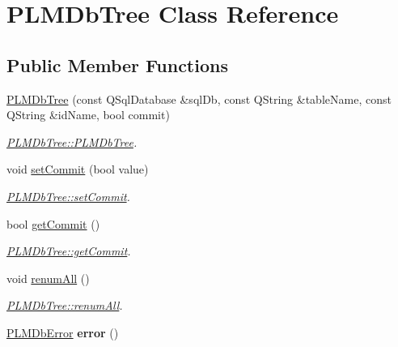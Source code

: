 \hypertarget{class_p_l_m_db_tree}{}\section{P\+L\+M\+Db\+Tree Class Reference}
\label{class_p_l_m_db_tree}
\subsection*{Public Member Functions}
\begin{DoxyCompactItemize}
\item 
\hyperlink{class_p_l_m_db_tree_a23d35341defc8ccd6cd75989eecca77b}{P\+L\+M\+Db\+Tree} (const Q\+Sql\+Database \&sql\+Db, const Q\+String \&table\+Name, const Q\+String \&id\+Name, bool commit)
\begin{DoxyCompactList}\small\item\em \hyperlink{class_p_l_m_db_tree_a23d35341defc8ccd6cd75989eecca77b}{P\+L\+M\+Db\+Tree\+::\+P\+L\+M\+Db\+Tree}. \end{DoxyCompactList}\item 
void \hyperlink{class_p_l_m_db_tree_aeab32bcea9b1ff524eeefa34248a5d86}{set\+Commit} (bool value)
\begin{DoxyCompactList}\small\item\em \hyperlink{class_p_l_m_db_tree_aeab32bcea9b1ff524eeefa34248a5d86}{P\+L\+M\+Db\+Tree\+::set\+Commit}. \end{DoxyCompactList}\item 
bool \hyperlink{class_p_l_m_db_tree_a68299ded7c927c8c2557915811ac9d10}{get\+Commit} ()
\begin{DoxyCompactList}\small\item\em \hyperlink{class_p_l_m_db_tree_a68299ded7c927c8c2557915811ac9d10}{P\+L\+M\+Db\+Tree\+::get\+Commit}. \end{DoxyCompactList}\item 
void \hyperlink{class_p_l_m_db_tree_a0ac15c9ac8b51d15c20ab6b7f03e60cb}{renum\+All} ()\hypertarget{class_p_l_m_db_tree_a0ac15c9ac8b51d15c20ab6b7f03e60cb}{}\label{class_p_l_m_db_tree_a0ac15c9ac8b51d15c20ab6b7f03e60cb}

\begin{DoxyCompactList}\small\item\em \hyperlink{class_p_l_m_db_tree_a0ac15c9ac8b51d15c20ab6b7f03e60cb}{P\+L\+M\+Db\+Tree\+::renum\+All}. \end{DoxyCompactList}\item 
\hyperlink{struct_p_l_m_db_error}{P\+L\+M\+Db\+Error} {\bfseries error} ()\hypertarget{class_p_l_m_db_tree_ad42a344bcf5101bf5d8456f390185476}{}\label{class_p_l_m_db_tree_ad42a344bcf5101bf5d8456f390185476}


\end{DoxyCompactItemize}
